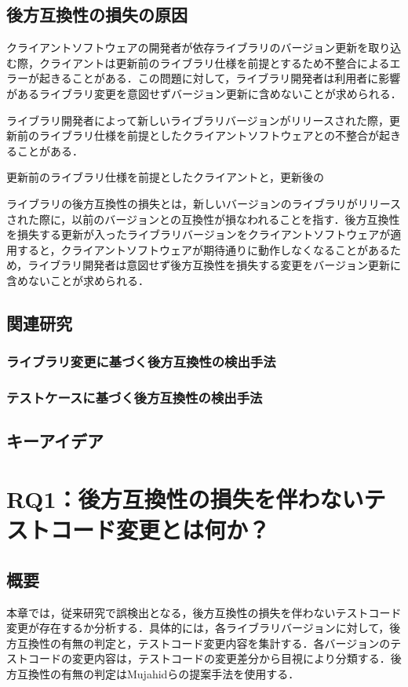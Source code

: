 \documentclass[11pt,dvipdfmx]{jreport}
\begin{document}
\section{後方互換性の損失の原因}
クライアントソフトウェアの開発者が依存ライブラリのバージョン更新を取り込む際，クライアントは更新前のライブラリ仕様を前提とするため不整合によるエラーが起きることがある．この問題に対して，ライブラリ開発者は利用者に影響があるライブラリ変更を意図せずバージョン更新に含めないことが求められる．

ライブラリ開発者によって新しいライブラリバージョンがリリースされた際，更新前のライブラリ仕様を前提としたクライアントソフトウェアとの不整合が起きることがある．

更新前のライブラリ仕様を前提としたクライアントと，更新後の


ライブラリの後方互換性の損失とは，新しいバージョンのライブラリがリリースされた際に，以前のバージョンとの互換性が損なわれることを指す．後方互換性を損失する更新が入ったライブラリバージョンをクライアントソフトウェアが適用すると，クライアントソフトウェアが期待通りに動作しなくなることがあるため，ライブラリ開発者は意図せず後方互換性を損失する変更をバージョン更新に含めないことが求められる．

\section{関連研究}

\subsection{ライブラリ変更に基づく後方互換性の検出手法}

\subsection{テストケースに基づく後方互換性の検出手法}

\section{キーアイデア}

\chapter{RQ1：後方互換性の損失を伴わないテストコード変更とは何か？}\label{rq1}

\section{概要}
本章では，従来研究で誤検出となる，後方互換性の損失を伴わないテストコード変更が存在するか分析する．具体的には，各ライブラリバージョンに対して，後方互換性の有無の判定と，テストコード変更内容を集計する．各バージョンのテストコードの変更内容は，テストコードの変更差分から目視により分類する．後方互換性の有無の判定はMujahidらの提案手法を使用する．
\end{document}
